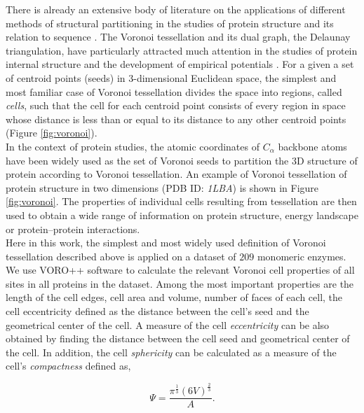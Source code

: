 \documentclass[11pt]{article}
\begin{document}
    There is already an extensive body of literature on the applications of different methods of structural partitioning in the studies of protein structure and its relation to sequence \cite{richards_interpretation_1974, gerstein_volume_1994}. The Voronoi tessellation and its dual graph, the Delaunay triangulation, have particularly attracted much attention in the studies of protein internal structure and the development of empirical potentials \cite{zomorodian_geometric_2006, zhou_alpha_2014, xia_identifying_2014}. For a given a set of centroid points (seeds) in 3-dimensional Euclidean space, the simplest and most familiar case of Voronoi tessellation divides the space into regions, called {\it cells}, such that the cell for each centroid point consists of every region in space whose distance is less than or equal to its distance to any other centroid points (Figure \ref{fig:voronoi}). \\


    In the context of protein studies, the atomic coordinates of $C_\alpha$ backbone atoms have been widely used as the set of Voronoi seeds to partition the 3D structure of protein according to Voronoi tessellation. An example of Voronoi tessellation of protein structure in two dimensions (PDB ID: {\it 1LBA}) is shown in Figure \ref{fig:voronoi}.  The properties of individual cells resulting from tessellation are then used to obtain a wide range of information on protein structure, energy landscape or protein--protein interactions. \\

    Here in this work, the simplest and most widely used definition of Voronoi tessellation described above is applied on a dataset of $209$  monomeric enzymes. We use VORO++ software \cite{rycroft_voro++:_2009} to calculate the relevant Voronoi cell properties of all sites in all proteins in the dataset. Among the most important properties are the length of the cell edges, cell area and volume, number of faces of each cell, the cell eccentricity defined as the distance between the cell's seed and the geometrical center of the cell. A measure of the cell {\it eccentricity} can be also obtained by finding the distance between the cell seed and geometrical center of the cell. In addition, the cell {\it sphericity} can be calculated as a measure of the cell's {\it compactness} defined as,

    \begin{equation}
        \label{eqn:sphericity}
        \Psi = \frac{\pi^{\frac{1}{3}}(6V)^{\frac{2}{3}}}{A}.
    \end{equation}
\end{document}
